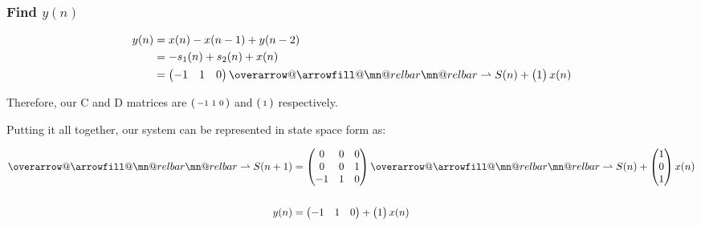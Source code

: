 \documentclass{article}
\makeatletter
\DeclareRobustCommand{\overrightharpoon}{\mathpalette{\overarrow@\rightharpoonfill@}}
\def\rightharpoonfill@{\arrowfill@\mn@relbar\mn@relbar\rightharpoonup}
\makeatother
\begin{document}
\subsubsection{Find $y(n)$}

\begin{align*}
	y(n) &= x(n) - x(n-1) + y(n-2) \\
	&= -s_1(n) + s_2(n) + x(n) \\
	&= \begin{pmatrix} -1 & 1 & 0 \end{pmatrix}\overrightharpoon{S(n)} + \begin{pmatrix} 1 \end{pmatrix}x(n)
\end{align*}

Therefore, our C and D matrices are $\begin{psmallmatrix} -1 & 1 & 0 \end{psmallmatrix}$ and $\begin{psmallmatrix} 1 \end{psmallmatrix}$ respectively.

Putting it all together, our system can be represented in state space form as:

\begin{align*}
	\overrightharpoon{S(n+1)} &= \begin{pmatrix} 0 & 0 & 0 \\ 0 & 0 & 1 \\ -1 & 1 & 0 \end{pmatrix}\overrightharpoon{S(n)} + \begin{pmatrix} 1 \\ 0 \\ 1 \end{pmatrix}x(n) \\ \\
	y(n) &= \begin{pmatrix} -1 & 1 & 0 \end{pmatrix} + \begin{pmatrix} 1 \end{pmatrix}x(n)
\end{align*}
\end{document}
